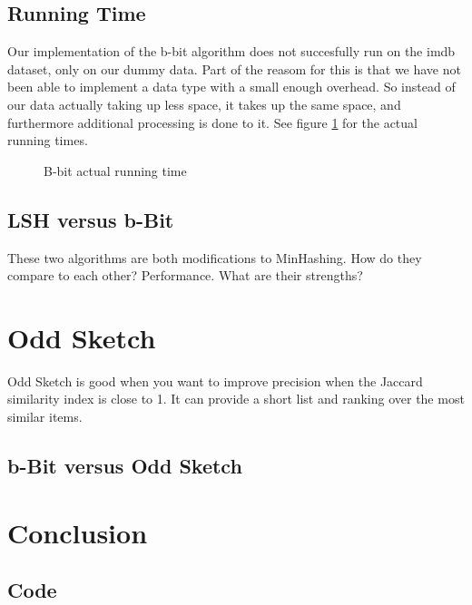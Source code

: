 \documentclass[a4paper,11pt]{article}
\begin{document}
\subsection{Running Time}
Our implementation of the b-bit algorithm does not succesfully run on the imdb dataset, only on our dummy data. Part of the reasom for this is that we have not been able to implement a data type with a small enough overhead. So instead of our data actually taking up less space, it takes up the same space, and furthermore additional processing is done to it. See figure \ref{fig:bbit_at} for the actual running times.\\

\begin{figure}[H]
    \begin{center}
        \caption{B-bit actual running time}
        \label{fig:bbit_at}
    \end{center}
\end{figure}

\subsection{LSH versus b-Bit}
These two algorithms are both modifications to MinHashing. How do they compare to each other? Performance. What are their strengths?

\section{Odd Sketch}
Odd Sketch is good when you want to improve precision when the Jaccard similarity index is close to 1. It can provide a short list and ranking over the most similar items.

\subsection{b-Bit versus Odd Sketch}


\section{Conclusion}
\newpage

\begin{appendices}
\section{Code}

\end{appendices}
\end{document}
